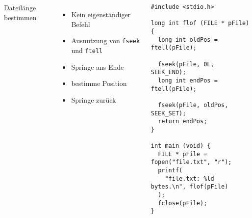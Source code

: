 \begin{frame}[fragile]
%
\begin{columns}[T]
\begin{Large}
Dateilänge bestimmen
\vspace{10pt}
\end{Large}
%
\begin{itemize}
\item Kein eigenständiger Befehl
\item Ausnutzung von \texttt{fseek} und \texttt{ftell}
\item Springe ans Ende
\item bestimme Position 
\item Springe zurück
\end{itemize}
%
\begin{codebox}
\begin{verbatim}
#include <stdio.h>

long int flof (FILE * pFile) {
  long int oldPos = ftell(pFile);
  
  fseek(pFile, 0L, SEEK_END);
  long int endPos = ftell(pFile);
  
  fseek(pFile, oldPos, SEEK_SET);
  return endPos;
}

int main (void) {
  FILE * pFile = fopen("file.txt", "r");  
  printf(
    "file.txt: %ld bytes.\n", flof(pFile)
  );
  fclose(pFile);
}
\end{verbatim}
\end{codebox}
\end{columns}
%
\end{frame}
